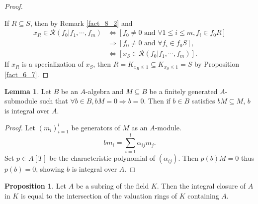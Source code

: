 \documentclass[10pt]{article}
\numberwithin{equation}{section}
\theoremstyle{definition}
\newtheorem{proposition}{Proposition}[subsection]
\newtheorem{lemma}{Lemma}[subsection]
\newcommand{\cR}[0]{\mathcal{R}}
\newcommand{\tand}[0]{\text{ and }}
\begin{document}
\begin{proof}$\:$
    \par If $R\subseteq S$, then by Remark \ref{fact_8_2} and
    \begin{align*}
        x_R\in\cR(f_0|f_1,\cdots,f_m) &\iff [f_0\not=0\tand \forall 1\leq i\leq m, f_i\in f_0R]\\
        &\Rightarrow [f_0\not=0\tand \forall f_i\in f_0S],\\
        &\iff [x_S\in\cR(f_0|f_1,\cdots,f_m)].
    \end{align*}
    If $x_R$ is a specialization of $x_S$, then $R = K_{x_R\leq 1}\subseteq K_{x_S\leq 1}=S$ by Proposition \ref{fact_6_7}.
\end{proof}

\begin{lemma}
    \label{lemma_8_aux}
    Let $B$ be an $A$-algebra and $M\subseteq B$ be a finitely generated $A$-submodule such that $\forall b\in B, bM=0\Rightarrow b=0$. Then if $b\in B$ satisfies $bM\subseteq M$, $b$ is integral over $A$.
\end{lemma}
\begin{proof}
    Let $(m_i)_{i=1}^l$ be generators of $M$ as an $A$-module.
    \begin{equation*}
        bm_i = \sum_{i=1}^l \alpha_{ij}m_j.
    \end{equation*}
    Set $p\in A[T]$ be the characteristic polynomial of $(\alpha_{ij})$. Then $p(b)M = 0$ thus $p(b) = 0$, showing $b$ is integral over $A$.
\end{proof}

\begin{proposition}
    \label{proposition_8_2}
    Let $A$ be a subring of the field $K$. Then the integral closure of $A$ in $K$ is equal to the intersection of the valuation rings of $K$ containing $A$.
\end{proposition}
\end{document}
